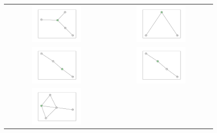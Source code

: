 \documentclass[12pt, a4paper]{extarticle}
\begin{document}
\begin{figure}\centering\begin{tabularx}{\textwidth}{cc}
\includegraphics[width=0.5\textwidth]{task11-graphlets/5_21-18-19-23-24.pdf} &
\includegraphics[width=0.5\textwidth]{task11-graphlets/3_18-25-23.pdf} \\
\includegraphics[width=0.5\textwidth]{task11-graphlets/4_14-21-18-23.pdf} &
\includegraphics[width=0.5\textwidth]{task11-graphlets/4_16-18-23-24.pdf} \\
\includegraphics[width=0.5\textwidth]{task11-graphlets/5_21-25-23-24-26.pdf} &

\end{tabularx}
\end{figure}
\end{document}

